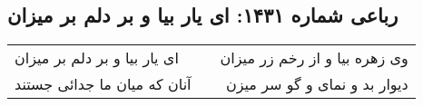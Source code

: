 \begin{center}
\section*{رباعی شماره ۱۴۳۱: ای یار بیا و بر دلم بر میزان}
\label{sec:1431}
\begin{longtable}{l p{0.5cm} r}
ای یار بیا و بر دلم بر میزان
&&
وی زهره بیا و از رخم زر میزان
\\
آنان که میان ما جدائی جستند
&&
دیوار بد و نمای و گو سر میزن
\\
\end{longtable}
\end{center}
